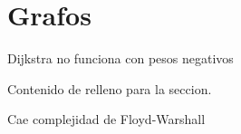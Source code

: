 \section{Grafos}

\begin{alertbox}
Dijkstra no funciona con pesos negativos
\end{alertbox}

Contenido de relleno para la seccion.

\begin{examenbox}
Cae complejidad de Floyd-Warshall
\end{examenbox}
